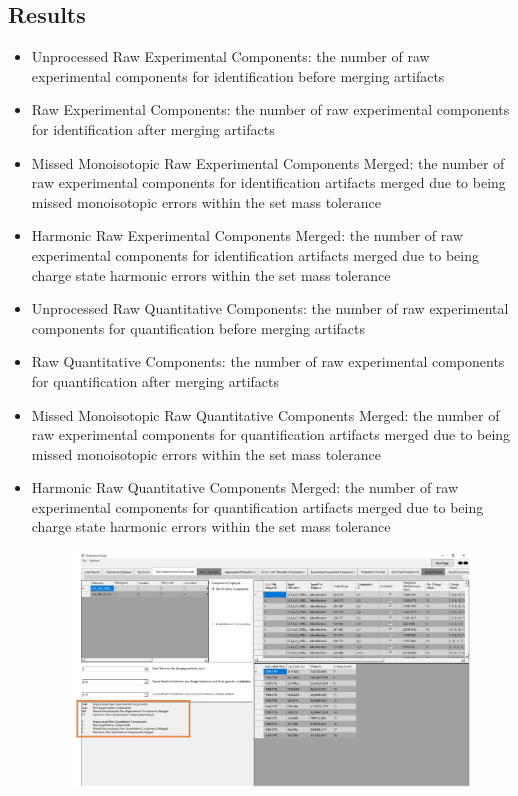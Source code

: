 \subsection{Results}
\begin{itemize}
	\item Unprocessed Raw Experimental Components: the number of raw experimental components for identification before merging artifacts
	\item Raw Experimental Components: the number of raw experimental components for identification after merging artifacts
	\item Missed Monoisotopic Raw Experimental Components Merged: the number of raw experimental components for identification artifacts merged due to being missed monoisotopic errors within the set mass tolerance
	\item Harmonic Raw Experimental Components Merged: the number of raw experimental components for identification artifacts merged due to being charge state harmonic errors within the set mass tolerance
	\item Unprocessed Raw Quantitative Components: the number of raw experimental components for quantification before merging artifacts
	\item Raw Quantitative Components: the number of raw experimental components for quantification after merging artifacts
	\item Missed Monoisotopic Raw Quantitative Components Merged: the number of raw experimental components for quantification artifacts merged due to being missed monoisotopic errors within the set mass tolerance
	\item Harmonic Raw Quantitative Components Merged: the number of raw experimental components for quantification artifacts merged due to being charge state harmonic errors within the set mass tolerance
	\begin{figure}[h]
\centering
\includegraphics[scale=0.5]{figures/rawcomponents2.jpg}

\end{figure}
\end{itemize}
